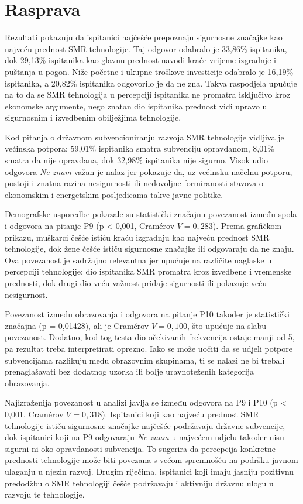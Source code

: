 \section{Rasprava}

Rezultati pokazuju da ispitanici najčešće prepoznaju sigurnosne značajke kao najveću prednost SMR tehnologije. Taj odgovor odabralo je 33,86\% ispitanika, dok 29,13\% ispitanika kao glavnu prednost navodi kraće vrijeme izgradnje i puštanja u pogon. Niže početne i ukupne troškove investicije odabralo je 16,19\% ispitanika, a 20,82\% ispitanika odgovorilo je da ne zna. Takva raspodjela upućuje na to da se SMR tehnologija u percepciji ispitanika ne promatra isključivo kroz ekonomske argumente, nego znatan dio ispitanika prednost vidi upravo u sigurnosnim i izvedbenim obilježjima tehnologije.

Kod pitanja o državnom subvencioniranju razvoja SMR tehnologije vidljiva je većinska potpora: 59,01\% ispitanika smatra subvenciju opravdanom, 8,01\% smatra da nije opravdana, dok 32,98\% ispitanika nije sigurno. Visok udio odgovora \textit{Ne znam} važan je nalaz jer pokazuje da, uz većinsku načelnu potporu, postoji i znatna razina nesigurnosti ili nedovoljne formiranosti stavova o ekonomskim i energetskim posljedicama takve javne politike.

Demografske usporedbe pokazale su statistički značajnu povezanost između spola i odgovora na pitanje P9 (p < 0,001, Cramérov \(V = 0{,}283\)). Prema grafičkom prikazu, muškarci češće ističu kraću izgradnju kao najveću prednost SMR tehnologije, dok žene češće ističu sigurnosne značajke ili odgovaraju da ne znaju. Ova povezanost je sadržajno relevantna jer upućuje na različite naglaske u percepciji tehnologije: dio ispitanika SMR promatra kroz izvedbene i vremenske prednosti, dok drugi dio veću važnost pridaje sigurnosti ili pokazuje veću nesigurnost.

Povezanost između obrazovanja i odgovora na pitanje P10 također je statistički značajna (p = 0,01428), ali je Cramérov \(V = 0{,}100\), što upućuje na slabu povezanost. Dodatno, kod tog testa dio očekivanih frekvencija ostaje manji od 5, pa rezultat treba interpretirati oprezno. Iako se može uočiti da se udjeli potpore subvencijama razlikuju među obrazovnim skupinama, ti se nalazi ne bi trebali prenaglašavati bez dodatnog uzorka ili bolje uravnoteženih kategorija obrazovanja.

Najizraženija povezanost u analizi javlja se između odgovora na P9 i P10 (p < 0,001, Cramérov \(V = 0{,}318\)). Ispitanici koji kao najveću prednost SMR tehnologije ističu sigurnosne značajke najčešće podržavaju državne subvencije, dok ispitanici koji na P9 odgovaraju \textit{Ne znam} u najvećem udjelu također nisu sigurni ni oko opravdanosti subvencija. To sugerira da percepcija konkretne prednosti tehnologije može biti povezana s većom spremnošću na podršku javnom ulaganju u njezin razvoj. Drugim riječima, ispitanici koji imaju jasniju pozitivnu predodžbu o SMR tehnologiji češće podržavaju i aktivniju državnu ulogu u razvoju te tehnologije.

